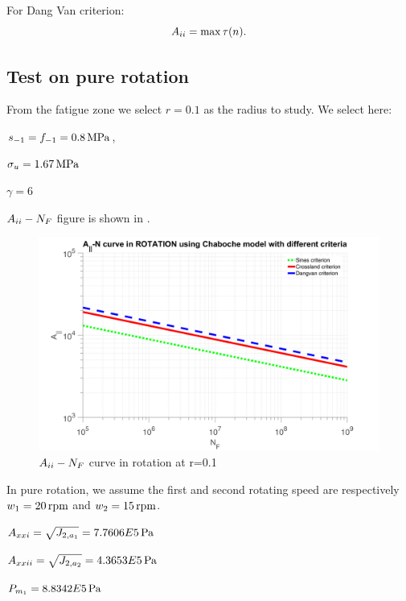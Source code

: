For Dang Van criterion:
$$A_{\uppercase\expandafter{\romannumeral2}}= \max\tau(n).$$ 


\subsection{Test on pure rotation}

From the fatigue zone we select $r=0.1$ as the radius to study. We select here:

$s_{-1}=f_{-1}=0.8\, \textnormal{MPa}$,

$\sigma_{u}=1.67\, \textnormal{MPa}$ 

$\gamma=6$


$A_{\uppercase\expandafter{\romannumeral2}}-N_F$ figure is shown in . 
\begin{figure}[!h]
	\centering
	\includegraphics[width=\textwidth]{figures//JNrotation.png} 
	\caption{$A_{\uppercase\expandafter{\romannumeral2}}-N_F$ curve in rotation at r=0.1}
	\label{JNrotation}
\end{figure}

In pure rotation, we assume the first and second rotating speed are respectively $w_1=20\, \textnormal{rpm}$ and $w_2=15\, \textnormal{rpm}$.  

\vspace{6pt}
$A_{\uppercase\expandafter{\romannumeral2}1}=\sqrt{J_{2,a_1}}=7.7606E5 \, \textnormal{Pa}$

\vspace{6pt}
$A_{\uppercase\expandafter{\romannumeral2}2}=\sqrt{J_{2,a_2}}=4.3653E5 \, \textnormal{Pa}$

\vspace{6pt}
$P_{m_1}=8.8342E5  \, \textnormal{Pa}$

